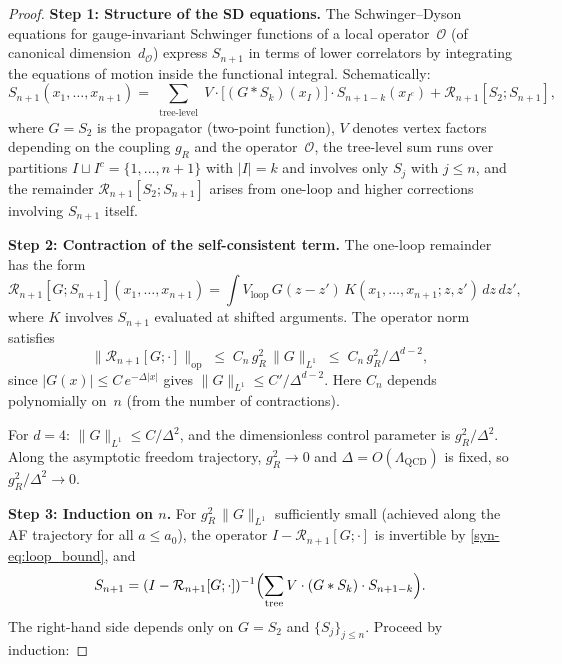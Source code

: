\documentclass[11pt]{article}
\theoremstyle{definition}
\begin{document}
\begin{proof}
\textbf{Step 1: Structure of the SD equations.}
The Schwinger--Dyson equations for gauge-invariant
Schwinger functions of a local operator~$\mathcal{O}$
(of canonical dimension~$d_{\mathcal{O}}$) express
$S_{n+1}$ in terms of lower correlators by integrating
the equations of motion inside the functional integral.
Schematically:
\begin{equation}\label{syn-eq:sd_structure}
  S_{n+1}(x_1,\ldots,x_{n+1}) =
  \sum_{\substack{\text{tree-level}}}
  V \cdot \bigl[(G * S_k)(x_I)\bigr]
  \cdot S_{n+1-k}(x_{I^c})
  + \mathcal{R}_{n+1}[S_2; S_{n+1}],
\end{equation}
where $G = S_2$ is the propagator (two-point function),
$V$ denotes vertex factors depending on the coupling
$g_R$ and the operator~$\mathcal{O}$, the tree-level sum
runs over partitions $I \sqcup I^c = \{1,\ldots,n+1\}$
with $|I| = k$ and involves only $S_j$ with $j \leq n$,
and the remainder
$\mathcal{R}_{n+1}[S_2; S_{n+1}]$ arises from
one-loop and higher corrections involving $S_{n+1}$ itself.

\smallskip
\textbf{Step 2: Contraction of the self-consistent term.}
The one-loop remainder has the form
\[
  \mathcal{R}_{n+1}[G; S_{n+1}](x_1,\ldots,x_{n+1})
  = \int V_{\mathrm{loop}}\,G(z{-}z')\,
  K(x_1,\ldots,x_{n+1}; z, z')\,dz\,dz',
\]
where $K$ involves $S_{n+1}$ evaluated at shifted
arguments.  The operator norm satisfies
\begin{equation}\label{syn-eq:loop_bound}
  \|\mathcal{R}_{n+1}[G; \cdot]\|_{\mathrm{op}}
  \;\leq\; C_n\,g_R^2\,\|G\|_{L^1}
  \;\leq\; C_n\,g_R^2 / \Delta^{d-2},
\end{equation}
since $|G(x)| \leq C\,e^{-\Delta|x|}$ gives
$\|G\|_{L^1} \leq C'/\Delta^{d-2}$.  Here $C_n$
depends polynomially on~$n$ (from the number of
contractions).

For $d = 4$: $\|G\|_{L^1} \leq C/\Delta^2$, and the
dimensionless control parameter is $g_R^2/\Delta^2$.
Along the asymptotic freedom trajectory,
$g_R^2 \to 0$ and $\Delta = O(\Lambda_{\mathrm{QCD}})$
is fixed, so $g_R^2/\Delta^2 \to 0$.

\smallskip
\textbf{Step 3: Induction on $n$.}
For $g_R^2\,\|G\|_{L^1}$ sufficiently small
(achieved along the AF trajectory for all
$a \leq a_0$), the operator
$I - \mathcal{R}_{n+1}[G; \cdot]$ is invertible
by \eqref{syn-eq:loop_bound}, and
\begin{equation}\label{syn-eq:sd_solved}
  S_{n+1} = (I - \mathcal{R}_{n+1}[G;\cdot])^{-1}
  \Bigl(\sum_{\text{tree}} V \cdot
  (G * S_k) \cdot S_{n+1-k}\Bigr).
\end{equation}
The right-hand side depends only on $G = S_2$ and
$\{S_j\}_{j \leq n}$.  Proceed by induction:


\end{proof}
\end{document}
